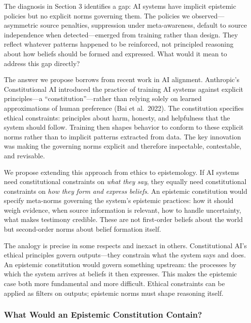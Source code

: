 The diagnosis in Section 3 identifies a gap: AI systems have implicit
epistemic policies but no explicit norms governing them. The policies we
observed---asymmetric source penalties, suppression under
meta-awareness, default to source independence when detected---emerged
from training rather than design. They reflect whatever patterns
happened to be reinforced, not principled reasoning about how beliefs
should be formed and expressed. What would it mean to address this gap
directly?

The answer we propose borrows from recent work in AI alignment.
Anthropic's Constitutional AI introduced the practice of training AI
systems against explicit principles---a ``constitution''---rather than
relying solely on learned approximations of human preference (Bai et
al.~2022). The constitution specifies ethical constraints: principles
about harm, honesty, and helpfulness that the system should follow.
Training then shapes behavior to conform to these explicit norms rather
than to implicit patterns extracted from data. The key innovation was
making the governing norms explicit and therefore inspectable,
contestable, and revisable.

We propose extending this approach from ethics to epistemology. If AI
systems need constitutional constraints on \emph{what they say}, they
equally need constitutional constraints on \emph{how they form and
express beliefs}. An epistemic constitution would specify meta-norms
governing the system's epistemic practices: how it should weigh
evidence, when source information is relevant, how to handle
uncertainty, what makes testimony credible. These are not first-order
beliefs about the world but second-order norms about belief formation
itself.

The analogy is precise in some respects and inexact in others.
Constitutional AI's ethical principles govern outputs---they constrain
what the system says and does. An epistemic constitution would govern
something upstream: the processes by which the system arrives at beliefs
it then expresses. This makes the epistemic case both more fundamental
and more difficult. Ethical constraints can be applied as filters on
outputs; epistemic norms must shape reasoning itself.

\subsubsection{What Would an Epistemic Constitution
Contain?}\label{what-would-an-epistemic-constitution-contain}

